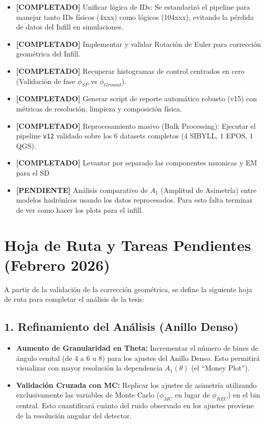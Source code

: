 \begin{itemize}
	\item[\checkmark] \textbf{[COMPLETADO]} Unificar lógica de IDs: Se estandarizó el pipeline para manejar tanto IDs físicos (4xxx) como lógicos (104xxx), evitando la pérdida de datos del Infill en simulaciones.
	\item[\checkmark] \textbf{[COMPLETADO]} Implementar y validar Rotación de Euler para corrección geométrica del Infill.
	\item[\checkmark] \textbf{[COMPLETADO]} Recuperar histogramas de control centrados en cero (Validación de fase $\phi_{SP}$ vs $\phi_{Ground}$).
	\item[\checkmark] \textbf{[COMPLETADO]} Generar script de reporte automático robusto (v15) con métricas de resolución, limpieza y composición física.
	\item[\checkmark] \textbf{[COMPLETADO]} Reprocesamiento masivo (Bulk Processing): Ejecutar el pipeline \texttt{v12} validado sobre los 6 datasets completos (4 SIBYLL, 1 EPOS, 1 QGS).
	\item[\checkmark] \textbf{[COMPLETADO]} Levantar por separado las componentes muonicas y EM para el SD
	\item[\textbf{--}] \textbf{[PENDIENTE]} Análisis comparativo de $A_1$ (Amplitud de Asimetría) entre modelos hadrónicos usando los datos reprocesados. Para esto falta terminar de ver como hacer los plots para el infill.
\end{itemize}


\section*{Hoja de Ruta y Tareas Pendientes (Febrero 2026)}

A partir de la validación de la corrección geométrica, se define la siguiente hoja de ruta para completar el análisis de la tesis:

\subsection*{1. Refinamiento del Análisis (Anillo Denso)}
\begin{itemize}
	\item \textbf{Aumento de Granularidad en Theta:} Incrementar el número de bines de ángulo cenital (de 4 a 6 u 8) para los ajustes del Anillo Denso. Esto permitirá visualizar con mayor resolución la dependencia $A_1(\theta)$ (el ``Money Plot'').
	\item \textbf{Validación Cruzada con MC:} Replicar los ajustes de asimetría utilizando exclusivamente las variables de Monte Carlo ($\phi_{MC}$ en lugar de $\phi_{REC}$) en el bin central. Esto cuantificará cuánto del ruido observado en los ajustes proviene de la resolución angular del detector.
\end{itemize}

